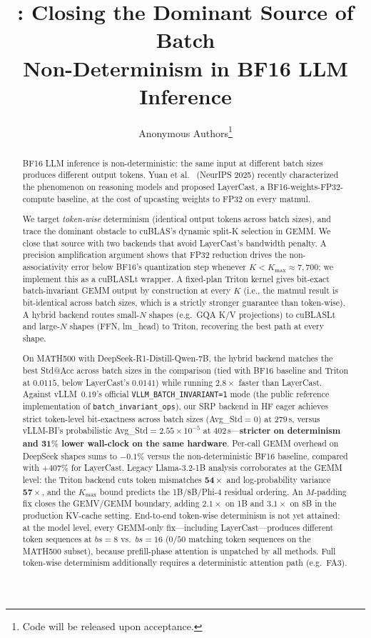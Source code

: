 \documentclass{article}
\title{\dllm: Closing the Dominant Source of Batch\\Non-Determinism in BF16 LLM Inference}
\author{%
  Anonymous Authors\thanks{Code will be released upon acceptance.}
}
\begin{document}
\maketitle

\begin{abstract}
BF16 LLM inference is non-deterministic: the same input at different batch
sizes produces different output tokens. Yuan et al.~\citep{yuan2025numerical}
(NeurIPS 2025) recently characterized the phenomenon on reasoning models and
proposed LayerCast, a BF16-weights-FP32-compute baseline, at the cost of
upcasting weights to FP32 on every matmul.

We target \emph{token-wise} determinism (identical output tokens across
batch sizes), and trace the dominant obstacle to cuBLAS's dynamic split-K
selection in GEMM. We close that source with two backends that avoid
LayerCast's bandwidth penalty. A precision amplification argument shows that
FP32 reduction drives the non-associativity error below BF16's quantization
step whenever $K<K_{\max}\!\approx\!7{,}700$; we implement this as a cuBLASLt
wrapper. A fixed-plan Triton kernel gives bit-exact batch-invariant GEMM
output by construction at every $K$ (i.e., the matmul result is bit-identical
across batch sizes, which is a strictly stronger guarantee than token-wise).
A hybrid backend routes small-$N$ shapes (e.g.\ GQA K/V projections) to
cuBLASLt and large-$N$ shapes (FFN, lm\_head) to Triton, recovering the best
path at every shape.

On MATH500 with DeepSeek-R1-Distill-Qwen-7B, the hybrid backend matches the
best Std@Acc across batch sizes in the comparison (tied with BF16 baseline
and Triton at $0.0115$, below LayerCast's $0.0141$) while running
$\mathbf{2.8\times}$ faster than LayerCast.
Against vLLM~$0.19$'s official \texttt{VLLM\_BATCH\_INVARIANT=1} mode (the
public reference implementation of \texttt{batch\_invariant\_ops}), our
SRP backend in HF eager achieves strict token-level bit-exactness across
batch sizes (Avg\_Std$=0$) at $279$\,s, versus vLLM-BI's probabilistic
Avg\_Std$=2.55\!\times\!10^{-5}$ at $402$\,s---\textbf{stricter on
determinism and $\mathbf{31\%}$ lower wall-clock on the same hardware}. Per-call GEMM overhead on
DeepSeek shapes sums to $-0.1\%$ versus the non-deterministic BF16 baseline,
compared with $+407\%$ for LayerCast. Legacy Llama-3.2-1B analysis corroborates
at the GEMM level: the Triton backend cuts token mismatches $\mathbf{54\times}$
and log-probability variance $\mathbf{57\times}$, and the $K_{\max}$ bound
predicts the 1B/8B/Phi-4 residual ordering. An $M$-padding fix closes the
GEMV/GEMM boundary, adding $2.1\times$ on 1B and $3.1\times$ on 8B in the
production KV-cache setting. End-to-end token-wise determinism is not yet attained: at the model level,
every GEMM-only fix---including LayerCast---produces different token
sequences at $bs\!=\!8$ vs.\ $bs\!=\!16$ ($0/50$ matching token sequences on
the MATH500 subset), because prefill-phase attention is unpatched by all
methods. Full token-wise determinism additionally requires a deterministic
attention path (e.g.\ FA3).
\end{abstract}
\end{document}
